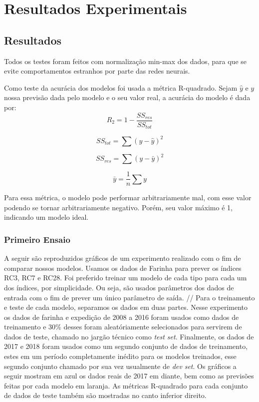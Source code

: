 \chapter{Resultados Experimentais }
\label{cap:resultados}

\section{Resultados}


Todos os testes foram feitos com normalização min-max dos dados, para que se evite comportamentos estranhos por parte das redes neurais. \\

\bigskip

Como teste da acurácia dos modelos foi usada a métrica R-quadrado. Sejam $\hat{y}$ e $y$ nossa previsão dada pelo modelo e o seu valor real, a acurácia do modelo é dada por:\\


\[R_2 = 1 - \frac{SS_{res}}{SS_{tot}}\]

\[SS_{tot} = \sum (y - \hat{y})^2\]

\[SS_{res} = \sum (y - \bar{y})^2\]

\[ \bar{y} = \frac{1}{n} \sum y\]

Para essa métrica, o modelo pode performar arbitrariamente mal, com esse valor podendo se tornar arbitrariamente negativo. Porém, seu valor máximo é 1, indicando um modelo ideal.\\

\bigskip
\subsection{Primeiro Ensaio}
A seguir são reproduzidos gráficos de um experimento realizado com o fim de comparar nossos modelos. Usamos os dados de Farinha para prever os índices RC3, RC7 e RC28. Foi preferido treinar um modelo de cada tipo para cada um dos índices, por simplicidade. Ou seja, são usados parâmetros dos dados de entrada com o fim de prever um único parâmetro de saída. //
Para o treinamento e teste de cada modelo, separamos os dados em duas partes. Nesse experimento os dados de farinha e expedição de 2008 a 2016 foram usados como dados de treinamento e 30\% desses foram aleatóriamente selecionados para servirem de dados de teste, chamado no jargão técnico como \textit{test set}. Finalmente, os dados de 2017 e 2018 foram usados como um segundo conjunto de dados de treinamento, estes em um período completamente inédito para os modelos treinados, esse segundo conjunto chamado por sua vez usualmente de \textit{dev set}. Os gráficos a seguir mostram em azul os dados reais de 2017 em diante, bem como as previsões feitas por cada modelo em laranja. As métricas R-quadrado para cada conjunto de dados de teste também são mostradas no canto inferior direito.




